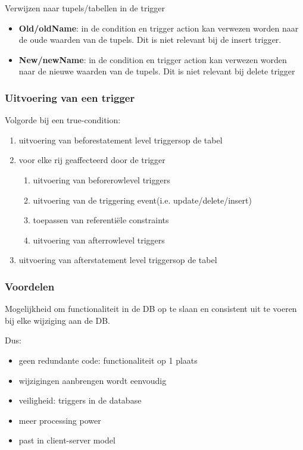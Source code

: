 \documentclass[a4paper,12pt]{article}
\begin{document}
Verwijzen naar tupels/tabellen in de trigger
\begin{itemize}
\item \textbf{Old/oldName}: in de condition en trigger action kan verwezen worden naar de oude waarden van de tupels.
Dit is niet relevant bij de insert trigger.
\item \textbf{New/newName}: in de condition en trigger action kan verwezen worden naar de nieuwe waarden van de tupels.
Dit is niet relevant bij delete trigger
\end{itemize}

\subsubsection{Uitvoering van een trigger}
Volgorde bij een true-condition:
\begin{enumerate}
\item uitvoering van beforestatement level triggersop de tabel
\item voor elke rij geaffecteerd door de trigger
\begin{enumerate}
\item uitvoering van beforerowlevel triggers
\item uitvoering van de triggering event(i.e. update/delete/insert)
\item toepassen van referentiële constraints
\item uitvoering van afterrowlevel triggers
\end{enumerate}
\item uitvoering van afterstatement level triggersop de tabel
\end{enumerate}

\subsubsection{Voordelen}
Mogelijkheid om functionaliteit in de DB op te slaan en consistent uit te voeren bij elke wijziging aan de DB.

Dus:
\begin{itemize}
\item geen redundante code: functionaliteit op 1 plaats
\item wijzigingen aanbrengen wordt eenvoudig
\item veiligheid: triggers in de database
\item meer processing power
\item past in client-server model
\end{itemize}
\end{document}
